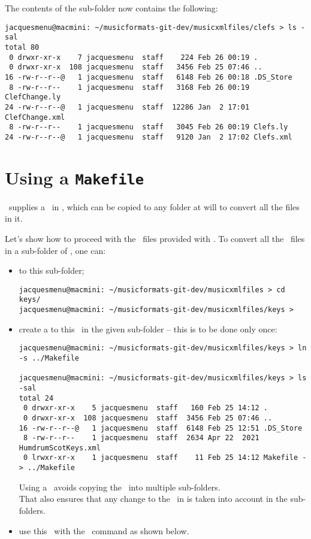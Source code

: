 The contents of the sub-folder now contains the following:
\begin{lstlisting}[language=Terminal]
jacquesmenu@macmini: ~/musicformats-git-dev/musicxmlfiles/clefs > ls -sal
total 80
 0 drwxr-xr-x    7 jacquesmenu  staff    224 Feb 26 00:19 .
 0 drwxr-xr-x  108 jacquesmenu  staff   3456 Feb 25 07:46 ..
16 -rw-r--r--@   1 jacquesmenu  staff   6148 Feb 26 00:18 .DS_Store
 8 -rw-r--r--    1 jacquesmenu  staff   3168 Feb 26 00:19 ClefChange.ly
24 -rw-r--r--@   1 jacquesmenu  staff  12286 Jan  2 17:01 ClefChange.xml
 8 -rw-r--r--    1 jacquesmenu  staff   3045 Feb 26 00:19 Clefs.ly
24 -rw-r--r--@   1 jacquesmenu  staff   9120 Jan  2 17:02 Clefs.xml
\end{lstlisting}


\section{Using a {\tt Makefile}}

\mf\ supplies a \Makefile\ in , which can be copied to any folder at will to convert all the  files in it.

Let's show how to proceed with the \mxml\ files provided with \mf.
To convert all the \mxml\ files in a sub-folder of , one can:
\begin{itemize}
\item {} to this sub-folder;
\begin{lstlisting}[language=Terminal]
jacquesmenu@macmini: ~/musicformats-git-dev/musicxmlfiles > cd keys/
jacquesmenu@macmini: ~/musicformats-git-dev/musicxmlfiles/keys >
\end{lstlisting}

\item create a {\it \symbolicLink} to this \Makefile\ in the given sub-folder -- this is to be done only once:
\begin{lstlisting}[language=Terminal]
jacquesmenu@macmini: ~/musicformats-git-dev/musicxmlfiles/keys > ln -s ../Makefile

jacquesmenu@macmini: ~/musicformats-git-dev/musicxmlfiles/keys > ls -sal
total 24
 0 drwxr-xr-x    5 jacquesmenu  staff   160 Feb 25 14:12 .
 0 drwxr-xr-x  108 jacquesmenu  staff  3456 Feb 25 07:46 ..
16 -rw-r--r--@   1 jacquesmenu  staff  6148 Feb 25 12:51 .DS_Store
 8 -rw-r--r--    1 jacquesmenu  staff  2634 Apr 22  2021 HumdrumScotKeys.xml
 0 lrwxr-xr-x    1 jacquesmenu  staff    11 Feb 25 14:12 Makefile -> ../Makefile
\end{lstlisting}

Using a \symbolicLink\ avoids copying the \Makefile\ into multiple sub-folders. \\
That also ensures that any change to the \Makefile\ in  is taken into account in the sub-folders.

\item use this \Makefile\ with the \make\ command as shown below.
\end{itemize}

